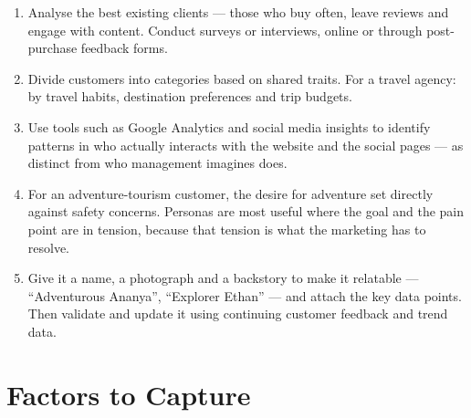 \documentclass{MMTextbook}
\begin{document}
\begin{enumerate}
\item {} Analyse the best existing clients
      --- those who buy often, leave reviews and engage with content. Conduct
      surveys or interviews, online or through post-purchase feedback forms.
\item {} Divide customers into categories based on
      shared traits. For a travel agency: by travel habits, destination
      preferences and trip budgets.
\item {} Use tools such as Google Analytics and social media
      insights to identify patterns in who actually interacts with the website
      and the social pages --- as distinct from who management imagines does.
\item {} For an adventure-tourism customer,
      the desire for adventure set directly against safety concerns. Personas
      are most useful where the goal and the pain point are in tension, because
      that tension is what the marketing has to resolve.
\item {} Give it a name, a photograph and a backstory to
      make it relatable --- ``Adventurous Ananya'', ``Explorer Ethan'' --- and
      attach the key data points. Then validate and update it using continuing
      customer feedback and trend data.
\end{enumerate}

\section{Factors to Capture}
\end{document}
